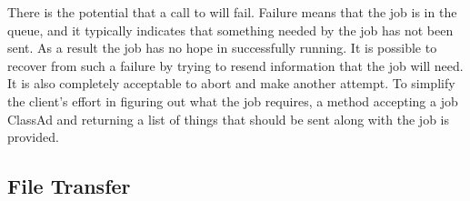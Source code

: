 

There is the
potential that a call to  will fail.
Failure means that the
job is in the queue,
and it typically indicates that
something needed by the job has not been sent.
As a result the job has no hope in successfully running.
It is possible to recover from
such a failure by trying to resend information that the job will
need. It is also completely acceptable to abort and make another
attempt. To simplify the client's effort in figuring out what the job
requires, a  method accepting a 
job ClassAd and
returning a list of things that should be sent along with the job is
provided.

\subsection{\label{WebService-File-Transfer} File Transfer}


